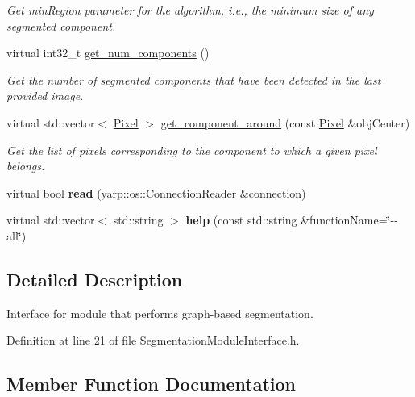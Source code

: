 \begin{DoxyCompactItemize}
\begin{DoxyCompactList}\small\item\em Get min\+Region parameter for the algorithm, i.\+e., the minimum size of any segmented component. \end{DoxyCompactList}\item 
virtual int32\+\_\+t \hyperlink{classyarp_1_1sig_1_1SegmentationModuleInterface_a3c6b695fbef9e6827e7dd6b4cbbc38fe}{get\+\_\+num\+\_\+components} ()
\begin{DoxyCompactList}\small\item\em Get the number of segmented components that have been detected in the last provided image. \end{DoxyCompactList}\item 
virtual std\+::vector$<$ \hyperlink{classyarp_1_1sig_1_1Pixel}{Pixel} $>$ \hyperlink{classyarp_1_1sig_1_1SegmentationModuleInterface_a9bf0b95fbab216b2284122b0b8a36820}{get\+\_\+component\+\_\+around} (const \hyperlink{classyarp_1_1sig_1_1Pixel}{Pixel} \&obj\+Center)
\begin{DoxyCompactList}\small\item\em Get the list of pixels corresponding to the component to which a given pixel belongs. \end{DoxyCompactList}\item 
virtual bool {\bfseries read} (yarp\+::os\+::\+Connection\+Reader \&connection)\label{classyarp_1_1sig_1_1SegmentationModuleInterface_ae35adf3fde4e4dd6e2dea92b6e396794}

\item 
virtual std\+::vector$<$ std\+::string $>$ {\bfseries help} (const std\+::string \&function\+Name=\char`\"{}-\/-\/all\char`\"{})\label{classyarp_1_1sig_1_1SegmentationModuleInterface_a14ea1dff9efc91a5099633740b3e45f9}

\end{DoxyCompactItemize}


\subsection{Detailed Description}
Interface for module that performs graph-\/based segmentation. 

Definition at line 21 of file Segmentation\+Module\+Interface.\+h.



\subsection{Member Function Documentation}
